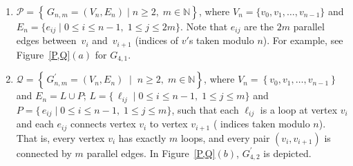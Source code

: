 \documentclass[11pt]{amsart}
\theoremstyle{plain}
\theoremstyle{definition}
\theoremstyle{remark}
\numberwithin{equation}{section}
\numberwithin{figure}{section}
\begin{document}
   \begin{enumerate}
       
    \item $\mathcal{P} = \left\{\, G_{n,m} = (V_n, E_n) \mid n \geq 2,\; m \in \mathbb{N} \right\}$, where $V_n = \{ v_0, v_1, \dots, v_{n-1} \}$ and $ E_n = \{ e_{ij} \mid 0 \leq i \leq n-1,\; 1 \leq j \leq 2m \}$. Note that $e_{ij}$ are the $2m$ parallel edges between~$v_i$ and~$v_{i+1}$ (indices of $v'$s taken modulo $n$). For example, see Figure~\ref{P,Q}$(a)$ for $G_{4,1}$.

\item $\mathcal{Q} = \left\{\, G_{n,m}^\prime = (V_n, E_n) \;\mid \; n \geq 2,\; m \in \mathbb{N}\right\}$, where $V_n = \left\{ v_0, v_1, \dots, v_{n-1}\right \}$ and $E_n = L \cup P$; $L = \{\, \ell_{ij} \mid 0 \leq i \leq n-1,\; 1 \leq j \leq m \}$ and  
$P = \{\, e_{ij} \mid 0 \leq i \leq n-1,\; 1 \leq j \leq m \}$,  such that each $\ell_{ij}$ is a loop at vertex $v_i$ and each $e_{ij}$ connects vertex $v_i$ to vertex $v_{i+1}$ ( indices taken modulo $n$). That is, every vertex $v_i$ has exactly $m$ loops, and every pair  $(v_i, v_{i+1})$ is connected by $m$ parallel edges. In Figure~\ref{P,Q}$(b)$, $G_{4,2}^\prime$ is depicted.

\end{enumerate} 
\end{document}
